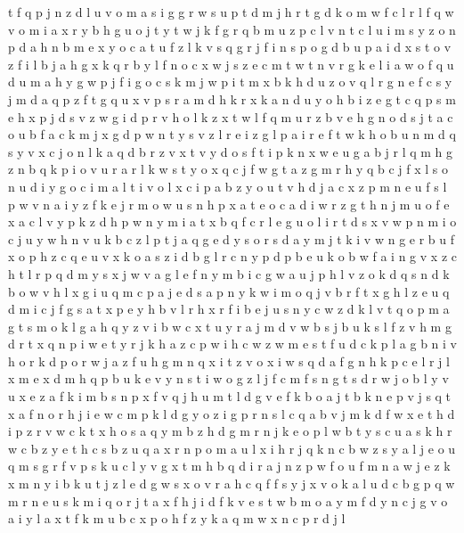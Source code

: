 \documentclass{article}
\begin{document}
t f q p j n z d l u v o m a s i g
g r
w s
u p t d m j h r
t g d k o m w f c l r
l f q w v o
m i a x r y b h g u o j t
y t w j k f g r q b m u z p c l v n
t c l u i m s y z o n p
d a
h n b m e x y o c a t u f z l k v s q g r j
f i n s p
o g d b u p a i
d x
s t o v z f i l b j a h g x
k q r b y l f n o c x w j s z e
c
m t w
t n v r g k e l i a w o f q u d
u m
a h y g w
p j f i g o c s
k m
j w p i t m x b k h d u z o v q l r g n e f c s y
j m d a q p
z f t g q u x v p s r a m d h k
r x k a n d u y o h b i z e g t c q p s
m e h x p j d s v z w g
i d p r v h o l k z x t w
l f q m u r z b v e h g n o d s j t a c
o u b f a c k m j x g d p w n t y s v z l r e i
z g l p a i r e f t w k h o b u n m d q s y v x c j
o n l k a q d b r z v x t
v y d o s f t i p k n x w e u g a b j r l q m h
g z n b q k p i o v
u r
a r l k w s t y o x q c
j f w g
t a z g m r h y q b c j f x l s o n u d
i
y g o c i
m a l t i
v
o l x c i p a b z y
o u t v h d j a c x z p m n e
u f s l p w v n a i
y z f k e j r m o w u s
n h p x a t e o c
a
d i w r z g t h n j m u o f e x a c l v y p
k z d h p w n y m i a t x b q f c r l e
g u o l i r
t d
s x v w p n m i o c j u y
w h n v u k b c z l p t j a q g e d y s o r
s d a y m j t k i v w n g e r b u f x o p h z c
q e u v x k o a s z i d b g l r c n y p
d p b
e u k o b w f a i n g v x z c h t l r p q d m y s
x j w v a g l
e f n y m b i c g w a u j p h l v z o k d q
s n d k b o w v h l x g i u q m c p a j e
d s a p n y k w i m o q j v b r f t x g h l z e u
q d m i c j f g s a t x p e y h b v l r
h x r f i b e j u s n y c w z d k l v t q o p m a g
t s m o k l g a h q y z v i b w
c x t u y r a j m d v w b s
j b u k s l f z v h m g d r t x q n p i w e
t y r j k h a z c p w i
h c w
z w m e s t f u d c k p l a g b n i v h o r
k d p o r w j a z f u h g m n q x i t
z v o x i w s q d a f g n h k p c e l r j
l x m e
x d m h q p b u k e v y n s t i w o g z l j f c
m f s
n g t s d r w j o b l y v u x e z a f k i m
b s n p x f v q
j
h u m t l d g v e f k b o a j
t b k n e p v j
s q t x a f n o r h j i e w c m p k l d g y
o z i g p r n s l c q a b v j m k d f w x e t h
d i p z r v w c k t x h o s a q y m b
z h d g m r n j k e o p l w b t y s c u a
s k h r w c b z y e
t h c s b z u q a x r n
p o m a u l x i h r j q k n c b w z s y
a l j e o u q m s g r f v p
s k u c l y v g x t m h b q d i r a j n z p w f o
u f m n a w j e z k x
m n y i b k u t j z l e d g w s x o v r a h c q f
f s y j x v o k a l u d c b g p q w m r
n e
u s
k m i q o r j t a x f
h j i d f k v e s t w b m o a y
m f d y n c j g v o a i
y l a x t f k m u b c
x p o h f
z y k a q m w x n c p r d j l
\end{document}
